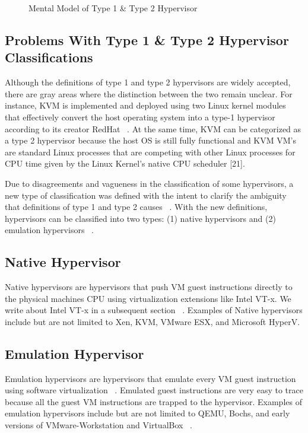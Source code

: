 \documentclass{report}
\begin{document}
\begin{spacing}{1.5}
\begin{figure}[ht]
    \caption{Mental Model of Type 1 \& Type 2 Hypervisor}
\end{figure}


\subsection{Problems With Type 1 \& Type 2 Hypervisor Classifications}

{\large
Although the definitions of type 1 and type 2 hypervisors are widely accepted, there are gray areas where the distinction between the two remain unclear. For instance, KVM is implemented and deployed using two Linux kernel modules that effectively convert the host operating system into a type-1 hypervisor according to its creator RedHat ~\cite{graziano2011performance}. At the same time, KVM can be categorized as a type 2 hypervisor because the host OS is still fully functional and KVM VM's are standard Linux processes that are competing with other Linux processes for CPU time given by the Linux Kernel's native CPU scheduler [21].
\newline
}


{\large
Due to disagreements and vagueness in the classification of some hypervisors, a new type of classification was defined with the intent to clarify the ambiguity that definitions of type 1 and type 2 causes ~\cite{10.1145/2775111}. With the new definitions, hypervisors can be classified into two types: (1) native hypervisors and (2) emulation hypervisors ~\cite{10.1145/2775111}.
\newline
}

\subsection{Native Hypervisor}

{\large
Native hypervisors are hypervisors that push VM guest instructions directly to the physical machines CPU using virtualization extensions like Intel VT-x. We write about Intel VT-x in a subsequent section ~\cite{10.1145/2775111}. Examples of Native hypervisors include but are not limited to Xen, KVM, VMware ESX, and Microsoft HyperV.
\newline
}


\subsection{Emulation Hypervisor}
{\large
Emulation hypervisors are hypervisors that emulate every VM guest instruction using software virtualization ~\cite{10.1145/2775111}. Emulated guest instructions are very easy to trace because all the guest VM instructions are trapped to the hypervisor. Examples of emulation hypervisors include but are not limited to  QEMU, Bochs, and early versions of VMware-Workstation and VirtualBox ~\cite{10.1145/2775111}.
\newline
}











\end{spacing}
\end{document}
